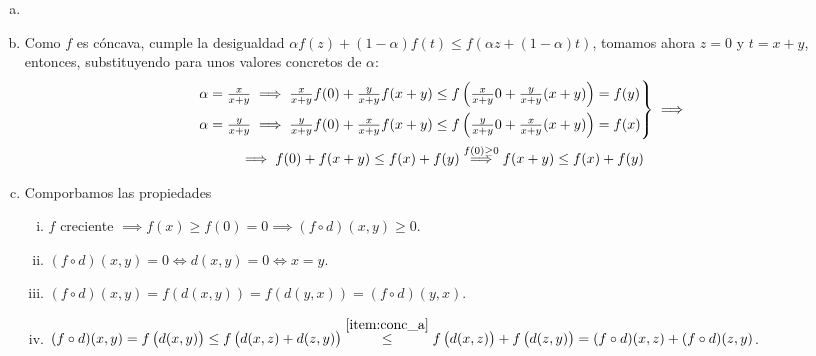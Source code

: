 \begin{eje}
    \begin{enumerate}[(a)]
        \item[]
        \item \label{item:conc_a} Como $f$ es cóncava, cumple la desigualdad $\alpha f(z) + (1-\alpha)f(t) \leq f\left( \alpha z + (1-\alpha)t \right)$, tomamos ahora
            $z = 0$ y $t=x+y$, entonces, substituyendo para unos valores concretos de $\alpha$:
            \begin{gather*}
                \begin{rcases}
                    \alpha = \frac{x}{x+y} \implies \frac{x}{x+y}f(0) + \frac{y}{x+y}f(x+y) \leq f\left( \frac{x}{x+y} 0 + \frac{y}{x+y}(x+y)\right) =f(y)\\
                    \alpha = \frac{y}{x+y} \implies \frac{y}{x+y}f(0) + \frac{x}{x+y}f(x+y) \leq f\left( \frac{y}{x+y} 0 + \frac{x}{x+y}(x+y)\right) =f(x)
                \end{rcases}
                \implies\\ \implies
                f(0) + f(x+y) \leq f(x) + f(y) \stackrel{f(0) \geq 0}{\implies} f(x+y) \leq f(x) + f(y)
            \end{gather*}
        \item Comporbamos las propiedades
            \begin{enumerate}[i)]
                \item $f$ creciente $\implies f(x) \geq f(0) = 0 \implies (f \circ d)(x,y) \geq 0$.
                \item $(f \circ d)(x,y) = 0 \iff d(x,y) = 0 \iff x = y$.
                \item $(f \circ d)(x,y) = f\left( d(x,y) \right) = f\left( d(y,x) \right) = (f \circ d)(y,x)$.
                \item $(f \circ d)(x,y) = f\left( d(x,y) \right) \leq f\left( d(x,z) + d(z,y) \right) \stackrel{\ref{item:conc_a}}{\leq}f\left( d(x,z) \right) +
                    f\left( d(z,y) \right) = (f \circ d)(x,z) + (f \circ d)(z,y)$.
            \end{enumerate}
    \end{enumerate}
\end{eje}

